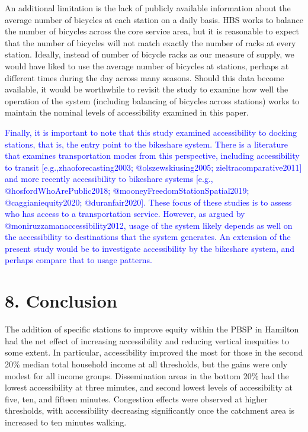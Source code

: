 \documentclass[]{elsarticle} %
\begin{document}
An additional limitation is the lack of publicly available information
about the average number of bicycles at each station on a daily basis.
HBS works to balance the number of bicycles across the core service
area, but it is reasonable to expect that the number of bicycles will
not match exactly the number of racks at every station. Ideally, instead
of number of bicycle racks as our measure of supply, we would have liked
to use the average number of bicycles at stations, perhaps at different
times during the day across many seasons. Should this data become
available, it would be worthwhile to revisit the study to examine how
well the operation of the system (including balancing of bicycles across
stations) works to maintain the nominal levels of accessibility examined
in this paper.

\textcolor{blue}{Finally, it is important to note that this study examined accessibility to docking stations, that is, the entry point to the bikeshare system. There is a literature that examines transportation modes from this perspective, including accessibility to transit [e.g.,zhaoforecasting2003; @olszewskiusing2005; zieltracomparative2011] and more recently accessibility to bikeshare systems [e.g., @hosfordWhoArePublic2018; @mooneyFreedomStationSpatial2019; @caggianiequity2020; @duranfair2020]. These focus of these studies is to assess who has access to a transportation service. However, as argued by @moniruzzamanaccessibility2012, usage of the system likely depends as well on the accessibility to destinations that the system generates. An extension of the present study would be to investigate accessibility by the bikeshare system, and perhaps compare that to usage patterns.}

\hypertarget{conclusion}{%
\section{8. Conclusion}\label{conclusion}}

The addition of specific stations to improve equity within the PBSP in
Hamilton had the net effect of increasing accessibility and reducing
vertical inequities to some extent. In particular, accessibility
improved the most for those in the second 20\% median total household
income at all thresholds, but the gains were only modest for all income
groups. Dissemination areas in the bottom 20\% had the lowest
accessibility at three minutes, and second lowest levels of
accessibility at five, ten, and fifteen minutes. Congestion effects were
observed at higher thresholds, with accessibility decreasing
significantly once the catchment area is increased to ten minutes
walking.
\end{document}
